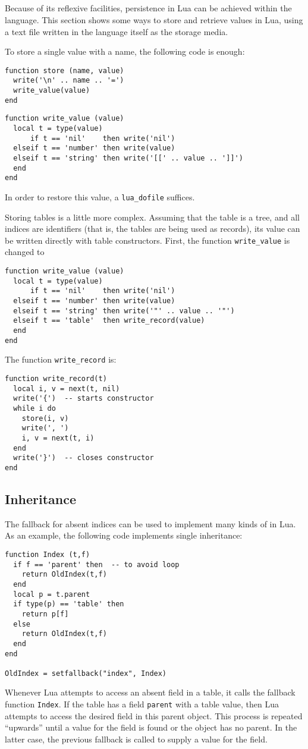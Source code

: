 \subsection{}
Because of its reflexive facilities,
persistence in Lua can be achieved within the language.
This section shows some ways to store and retrieve values in Lua,
using a text file written in the language itself as the storage media.

To store a single value with a name,
the following code is enough:
\begin{verbatim}
function store (name, value)
  write('\n' .. name .. '=')
  write_value(value)
end
\end{verbatim}
\begin{verbatim}
function write_value (value)
  local t = type(value)
      if t == 'nil'    then write('nil')
  elseif t == 'number' then write(value)
  elseif t == 'string' then write('[[' .. value .. ']]')
  end
end
\end{verbatim}
In order to restore this value, a \verb'lua_dofile' suffices.

Storing tables is a little more complex.
Assuming that the table is a tree,
and all indices are identifiers
(that is, the tables are being used as records),
its value can be written directly with table constructors.
First, the function \verb'write_value' is changed to
\begin{verbatim}
function write_value (value)
  local t = type(value)
      if t == 'nil'    then write('nil')
  elseif t == 'number' then write(value)
  elseif t == 'string' then write('"' .. value .. '"')
  elseif t == 'table'  then write_record(value)
  end
end
\end{verbatim}
The function \verb'write_record' is:
\begin{verbatim}
function write_record(t)
  local i, v = next(t, nil)
  write('{')  -- starts constructor
  while i do
    store(i, v)
    write(', ')
    i, v = next(t, i)
  end
  write('}')  -- closes constructor
end
\end{verbatim}


\subsection{Inheritance} \label{exfallback}
The fallback for absent indices can be used to implement many
kinds of  in Lua.
As an example,
the following code implements single inheritance:
\begin{verbatim}
function Index (t,f)
  if f == 'parent' then  -- to avoid loop
    return OldIndex(t,f)
  end
  local p = t.parent
  if type(p) == 'table' then
    return p[f]
  else
    return OldIndex(t,f)
  end
end

OldIndex = setfallback("index", Index)
\end{verbatim}
Whenever Lua attempts to access an absent field in a table,
it calls the fallback function \verb'Index'.
If the table has a field \verb'parent' with a table value,
then Lua attempts to access the desired field in this parent object.
This process is repeated ``upwards'' until a value
for the field is found or the object has no parent.
In the latter case, the previous fallback is called to supply a value
for the field.

